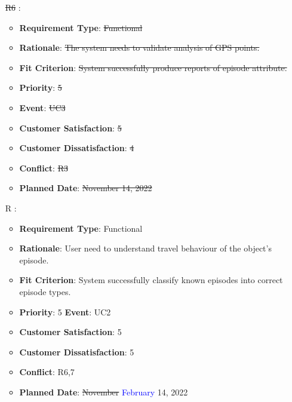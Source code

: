 \documentclass[12pt, titlepage]{article}
\newcounter{reqnum} %
\begin{document}
\begin{itemize}
\item[\sout{R6}
\label{R_Inputs_1}:] 
\begin{itemize}
    \item \textbf{Requirement Type}: \sout{Functional}
    \item \textbf{Rationale}: \sout{The system needs to validate  analysis of GPS points.}
    \item \textbf{Fit Criterion}: \sout{System successfully produce reports of episode attribute.}
    \item \textbf{Priority}: \sout{5}
    \item \textbf{Event}: \sout{UC3}
    \item \textbf{Customer Satisfaction}: \sout{5}
    \item \textbf{Customer Dissatisfaction}: \sout{4}
    \item \textbf{Conflict}: \sout{R3}
    \item \textbf{Planned Date}: \sout{November 14, 2022}
\end{itemize}

\item[R\refstepcounter{reqnum}\thereqnum
\label{R_Inputs_1}:] 
\begin{itemize}
    \item \textbf{Requirement Type}: Functional
    \item \textbf{Rationale}: User need to understand travel behaviour of the object's episode.
    \item \textbf{Fit Criterion}: System successfully classify known episodes into correct episode types. 
    \item \textbf{Priority}: 5
    \textbf{Event}: UC2
    \item \textbf{Customer Satisfaction}: 5
    \item \textbf{Customer Dissatisfaction}: 5
    \item \textbf{Conflict}: R6,7
    \item \textbf{Planned Date}: \sout{November} \textcolor{blue}{February} 14, 2022
\end{itemize}


\end{itemize}
\end{document}
